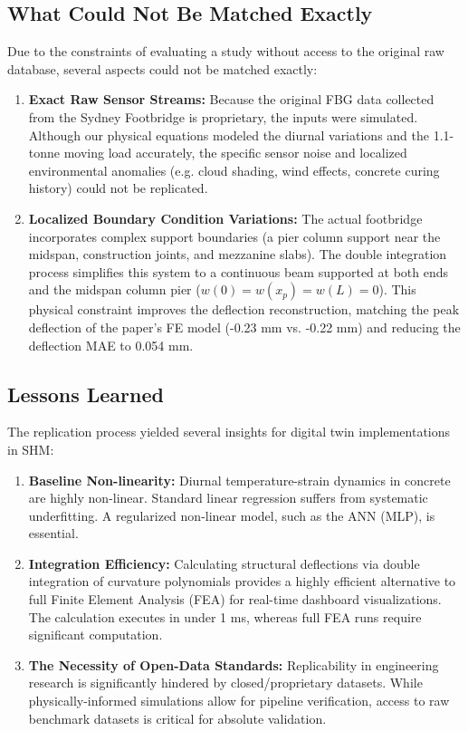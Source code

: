 \documentclass[11pt,journal,onecolumn]{IEEEtran}
\begin{document}
\subsection{What Could Not Be Matched Exactly}
Due to the constraints of evaluating a study without access to the original raw database, several aspects could not be matched exactly:
\begin{enumerate}
    \item \textbf{Exact Raw Sensor Streams:} Because the original FBG data collected from the Sydney Footbridge is proprietary, the inputs were simulated. Although our physical equations modeled the diurnal variations and the 1.1-tonne moving load accurately, the specific sensor noise and localized environmental anomalies (e.g. cloud shading, wind effects, concrete curing history) could not be replicated.
    \item \textbf{Localized Boundary Condition Variations:} The actual footbridge incorporates complex support boundaries (a pier column support near the midspan, construction joints, and mezzanine slabs). The double integration process simplifies this system to a continuous beam supported at both ends and the midspan column pier ($w(0)=w(x_p)=w(L)=0$). This physical constraint improves the deflection reconstruction, matching the peak deflection of the paper's FE model (-0.23 mm vs. -0.22 mm) and reducing the deflection MAE to 0.054 mm.
\end{enumerate}

\subsection{Lessons Learned}
The replication process yielded several insights for digital twin implementations in SHM:
\begin{enumerate}
    \item \textbf{Baseline Non-linearity:} Diurnal temperature-strain dynamics in concrete are highly non-linear. Standard linear regression suffers from systematic underfitting. A regularized non-linear model, such as the ANN (MLP), is essential.
    \item \textbf{Integration Efficiency:} Calculating structural deflections via double integration of curvature polynomials provides a highly efficient alternative to full Finite Element Analysis (FEA) for real-time dashboard visualizations. The calculation executes in under 1 ms, whereas full FEA runs require significant computation.
    \item \textbf{The Necessity of Open-Data Standards:} Replicability in engineering research is significantly hindered by closed/proprietary datasets. While physically-informed simulations allow for pipeline verification, access to raw benchmark datasets is critical for absolute validation.
\end{enumerate}
\end{document}
